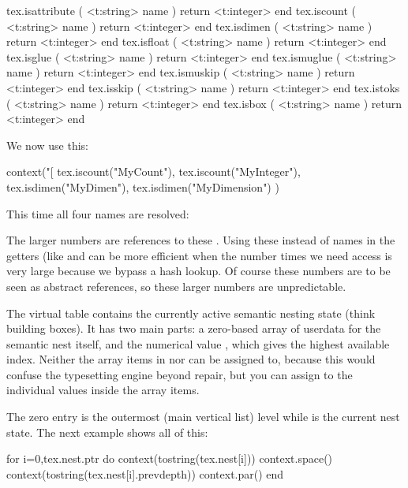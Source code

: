 \starttyping[option=LUA]
tex.isattribute ( <t:string> name ) return <t:integer> end
tex.iscount     ( <t:string> name ) return <t:integer> end
tex.isdimen     ( <t:string> name ) return <t:integer> end
tex.isfloat     ( <t:string> name ) return <t:integer> end
tex.isglue      ( <t:string> name ) return <t:integer> end
tex.ismuglue    ( <t:string> name ) return <t:integer> end
tex.ismuskip    ( <t:string> name ) return <t:integer> end
tex.isskip      ( <t:string> name ) return <t:integer> end
tex.istoks      ( <t:string> name ) return <t:integer> end
tex.isbox       ( <t:string> name ) return <t:integer> end
\stoptyping

We now use this:

\startbuffer
\startluacode
    context("[%
        tex.iscount("MyCount"),
        tex.iscount("MyInteger"),
        tex.isdimen("MyDimen"),
        tex.isdimen("MyDimension")
    )
\stopluacode
\stopbuffer

\typebuffer[option=LUA]

This time all four names are resolved:

\getbuffer

The larger numbers are references to these . Using these
instead of names in the getters (like  and  can
be more efficient when the number times we need access is very large because we
bypass a hash lookup. Of course these numbers are to be seen as abstract
references, so these larger numbers are unpredictable.

\stopsubsection

\startsubsection[title=Nesting]

The virtual table  contains the currently active semantic nesting
state (think building boxes). It has two main parts: a zero-based array of
userdata for the semantic nest itself, and the numerical value , which
gives the highest available index. Neither the array items in  nor
 can be assigned to, because this would confuse the typesetting engine
beyond repair, but you can assign to the individual values inside the array
items.

The zero entry  is the outermost (main vertical list) level while
 is the current nest state. The next example shows
all of this:

\startbuffer
\setbox\scratchbox\vbox\bgroup
    \vbox\bgroup
        \startluacode
            for i=0,tex.nest.ptr do
                context(tostring(tex.nest[i]))
                context.space()
                context(tostring(tex.nest[i].prevdepth))
                context.par()
            end
        \stopluacode
    \egroup
\egroup
\stopbuffer

